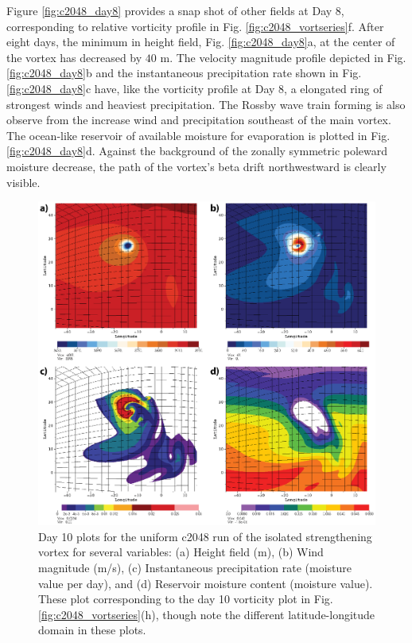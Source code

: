    Figure \ref{fig:c2048_day8} provides a snap shot of other fields at Day 8, 
   corresponding to relative vorticity profile in Fig. \ref{fig:c2048_vortseries}f.
   After eight days, the minimum in height field, Fig. \ref{fig:c2048_day8}a,
   at the center of the vortex has decreased by $40$ m. The velocity magnitude
   profile depicted in Fig. \ref{fig:c2048_day8}b and the instantaneous precipitation rate 
   shown in Fig. \ref{fig:c2048_day8}c have, like the vorticity profile at Day 8, a
   elongated ring of strongest winds and heaviest precipitation. The Rossby wave train
   forming is also observe from the increase wind and precipitation southeast of the main vortex.
   The ocean-like reservoir of available moisture for evaporation is plotted in Fig. \ref{fig:c2048_day8}d. 
   Against the background of the zonally symmetric poleward moisture decrease, 
   the path of the vortex's beta drift northwestward is clearly visible. 
   
\begin{figure}
    \centerline{%
    \noindent
    \includegraphics[width=\textwidth]{Chap2/c2048_day10_plots-01.eps}}
   \caption{Day 10 plots for the uniform c2048 run of the isolated strengthening vortex for several variables: 
   (a) Height field (m), (b) Wind magnitude (m/s), (c) Instantaneous precipitation rate (moisture value per day), 
   and (d) Reservoir moisture content (moisture value).
   These plot corresponding to the day 10 vorticity plot in Fig. \ref{fig:c2048_vortseries}(h), though
    note the different latitude-longitude domain in these plots. }%
    \label{fig:c2048_day10}
\end{figure}

